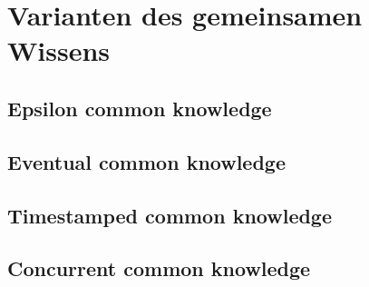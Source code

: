 \section{Varianten des gemeinsamen Wissens}
\label{GemeinsamesWissen}

\subsection{Epsilon common knowledge}
\label{epsilon_comm_know}

\subsection{Eventual common knowledge}
\label{eventual_comm_know}

\subsection{Timestamped common knowledge}
\label{timestamped_comm_know}

\subsection{Concurrent common knowledge}
\label{concurrent_comm_know}
